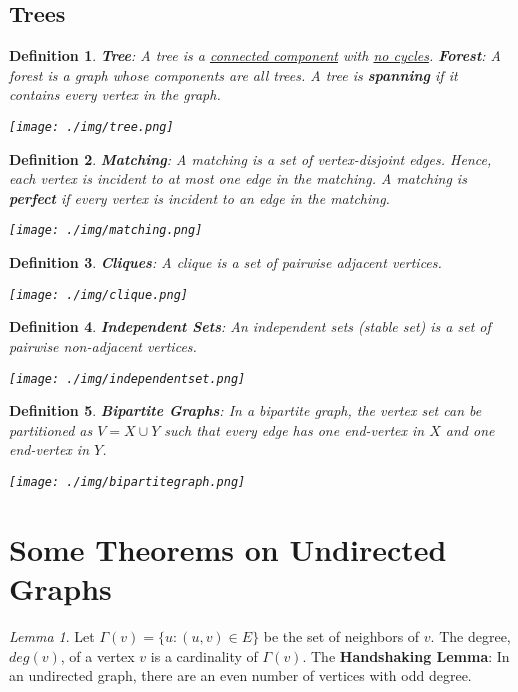 \documentclass[11pt, a4paper, oneside]{book}
\theoremstyle{theoremdd}
\newtheorem*{definition}{Definition}
\theoremstyle{remark}
\newtheorem{lemma}{Lemma}[section]
\begin{document}
\subsection*{Trees}
\begin{definition}
\textbf{Tree}: A tree is a \underline{connected component} with \underline{no cycles}. \textbf{Forest}: A forest is a graph whose components are all trees.  A tree is \textbf{spanning} if it contains every vertex in the graph.
\begin{center}
\texttt{[image: ./img/tree.png]}
\end{center} 
\end{definition}

\begin{definition}
\textbf{Matching}: A matching is a set of vertex-disjoint edges. Hence, each vertex is incident to at most one edge in the matching. A matching is \textbf{perfect} if every vertex is incident to an edge in the matching. 
\begin{center}
\texttt{[image: ./img/matching.png]}
\end{center}
\end{definition}

\begin{definition}
\textbf{Cliques}: A clique is a set of pairwise adjacent vertices. 
\begin{center}
\texttt{[image: ./img/clique.png]}
\end{center}
\end{definition}

\begin{definition}
\textbf{Independent Sets}: An independent sets (stable set) is a set of pairwise non-adjacent vertices.
\begin{center}
\texttt{[image: ./img/independentset.png]}
\end{center}
\end{definition}

\begin{definition}
\textbf{Bipartite Graphs}: In a bipartite graph, the vertex set can be partitioned as $V=X\cup Y$ such that every edge has one end-vertex in $X$ and one end-vertex in $Y$.
\begin{center}
\texttt{[image: ./img/bipartitegraph.png]}
\end{center}
\end{definition}

\section*{Some Theorems on Undirected Graphs}
\begin{lemma}
Let $\Gamma(v)=\{u:(u,v)\in E\}$ be the set of neighbors of $v$. The degree, $deg(v)$, of a vertex $v$ is a cardinality of $\Gamma(v)$. The \textbf{Handshaking Lemma}: In an undirected graph, there are an even number of vertices with odd degree. 
\end{lemma}
\end{document}
